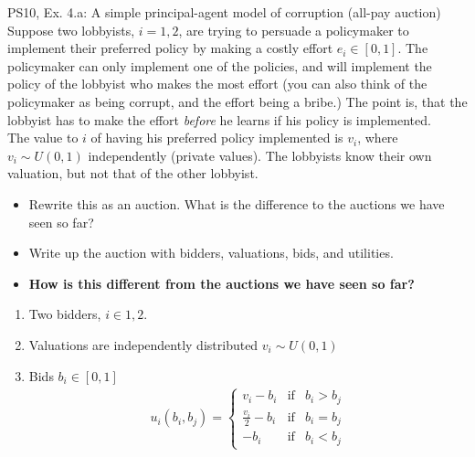 \begin{frame}{PS10, Ex. 4.a: A simple principal-agent model of corruption (all-pay auction)}
    Suppose two lobbyists, $i = 1, 2$, are trying to persuade a policymaker to implement their preferred policy by making a costly effort $e_i\in[0, 1]$. The policymaker can only implement one of the policies, and will implement the policy of the lobbyist who makes the most effort (you can also think of the policymaker as being corrupt, and the effort being a bribe.) The point is, that the lobbyist has to make the effort \textit{before} he learns if his policy is implemented.\\\medskip
    The value to $i$ of having his preferred policy implemented is $v_i$, where $v_i\sim U(0, 1)$ independently (private values). The lobbyists know their own valuation, but not that of the other lobbyist.
    \begin{itemize}
      \item[(a)] Rewrite this as an auction. What is the difference to the auctions we have seen so far?
    \end{itemize}
    \vspace{-8pt}
    \begin{multicols}{2}
      \begin{itemize}
        \item[Step 1:] Write up the auction with bidders, valuations, bids, and utilities.
        \item[Step 2:] \textbf{How is this different from the auctions we have seen so far?}
      \end{itemize}
      \vfill\null\columnbreak
      \begin{enumerate}
        \item Two bidders, $i\in1,2$.
        \item[] Valuations are independently distributed $v_i\sim U(0, 1)$
        \item[] Bids $b_i\in[0,1]$
        \begin{align*}
          u_i(b_i,b_j)=\left\{\begin{array}{lcl}
            v_i-b_i           & \text{if} & b_i>b_j \\
            \frac{v_i}{2}-b_i & \text{if} & b_i=b_j \\
            -b_i              & \text{if} & b_i<b_j
          \end{array}\right.
        \end{align*}
      \end{enumerate}
      \vfill\null
    \end{multicols}
\end{frame}
